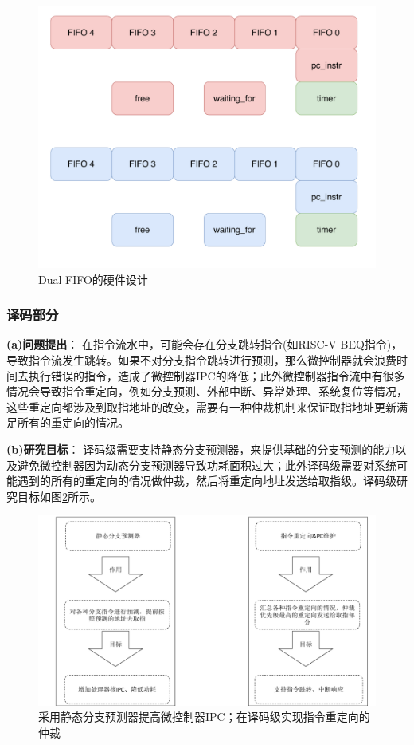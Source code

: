 \documentclass[a4paper, 12pt]{article}
\begin{document}
\begin{figure}[htbp]
  \centering
  \includegraphics[width=0.6\linewidth]{./images/if_dual_fifo.pdf}
  \caption{Dual FIFO的硬件设计}
  \label{fig:if_dual_fifo}
\end{figure}

\subsubsection{译码部分}
\textbf{(a)问题提出}：
在指令流水中，可能会存在分支跳转指令(如RISC-V BEQ指令)，导致指令流发生跳转\cite{al2020hybrid}。如果不对分支指令跳转进行预测，那么微控制器就会浪费时间去执行错误的指令，造成了微控制器IPC的降低\cite{arul2020design}；此外微控制器指令流中有很多情况会导致指令重定向，例如分支预测、外部中断、异常处理、系统复位等情况\cite{benila2022plan}，这些重定向都涉及到取指地址的改变，需要有一种仲裁机制来保证取指地址更新满足所有的重定向的情况\cite{choudhury2022optimized}。

\textbf{(b)研究目标}：
译码级需要支持静态分支预测器，来提供基础的分支预测的能力以及避免微控制器因为动态分支预测器导致功耗面积过大\cite{park2019branch}；此外译码级需要对系统可能遇到的所有的重定向的情况做仲裁，然后将重定向地址发送给取指级\cite{miyazaki2020rvcorep}。译码级研究目标如图\ref{fig:id_design_features}所示。

\begin{figure}[htbp]
  \centering
  \includegraphics[width=0.8\linewidth]{./images/id_design_features.pdf}
  \caption{采用静态分支预测器提高微控制器IPC；在译码级实现指令重定向的仲裁}
  \label{fig:id_design_features}
\end{figure}
\end{document}
